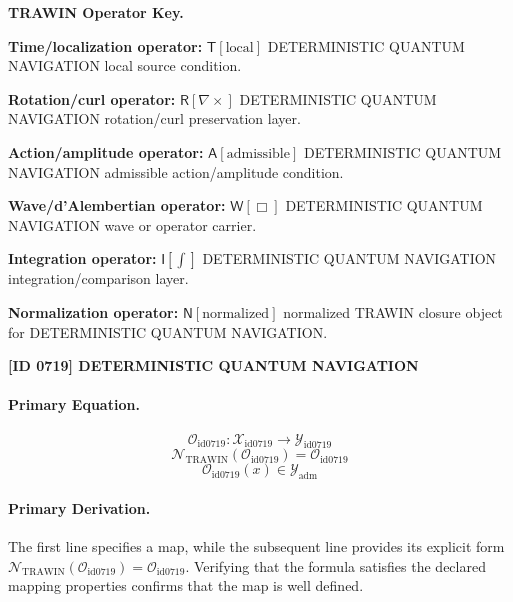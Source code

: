 \par\vspace{0.45\baselineskip}
\noindent\begin{minipage}[t]{\linewidth}
\begingroup
\small
\raggedright
\textbf{TRAWIN Operator Key.}\par
\noindent\textbf{Time/localization operator:} $\mathsf{T}\!\left[\mathrm{local}\right]$ DETERMINISTIC QUANTUM NAVIGATION local source condition.\par
\noindent\textbf{Rotation/curl operator:} $\mathsf{R}\!\left[\nabla\times\right]$ DETERMINISTIC QUANTUM NAVIGATION rotation/curl preservation layer.\par
\noindent\textbf{Action/amplitude operator:} $\mathsf{A}\!\left[\mathrm{admissible}\right]$ DETERMINISTIC QUANTUM NAVIGATION admissible action/amplitude condition.\par
\noindent\textbf{Wave/d'Alembertian operator:} $\mathsf{W}\!\left[\Box\right]$ DETERMINISTIC QUANTUM NAVIGATION wave or operator carrier.\par
\noindent\textbf{Integration operator:} $\mathsf{I}\!\left[\int\right]$ DETERMINISTIC QUANTUM NAVIGATION integration/comparison layer.\par
\noindent\textbf{Normalization operator:} $\mathsf{N}\!\left[\mathrm{normalized}\right]$ normalized TRAWIN closure object for DETERMINISTIC QUANTUM NAVIGATION.\par
\endgroup
\end{minipage}

\clearpage
\noindent\textbf{[ID 0719] DETERMINISTIC QUANTUM NAVIGATION}\par
\vspace{0.35em}
\paragraph{Primary Equation.}
\[
\mathcal{O}_{\mathrm{id0719}}:\mathcal{X}_{\mathrm{id0719}}\longrightarrow\mathcal{Y}_{\mathrm{id0719}}
\]
\[
\mathcal{N}_{\mathrm{TRAWIN}}(\mathcal{O}_{\mathrm{id0719}})=\mathcal{O}_{\mathrm{id0719}}
\]
\[
\mathcal{O}_{\mathrm{id0719}}(x)\in\mathcal{Y}_{\mathrm{adm}}
\]

\paragraph{Primary Derivation.}
The first line specifies a map, while the subsequent line provides its explicit form \( \mathcal{N}_{\mathrm{TRAWIN}}(\mathcal{O}_{\mathrm{id0719}})=\mathcal{O}_{\mathrm{id0719}} \). Verifying that the formula satisfies the declared mapping properties confirms that the map is well defined.
